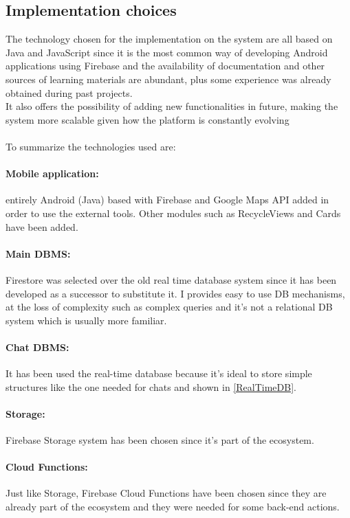 \clearpage
\subsection{Implementation choices}
\label{Implementation choices}
The technology chosen for the implementation on the system are all based on Java and JavaScript since it is the most common way of developing Android applications using Firebase and the availability of documentation and other sources of learning materials are abundant, plus some experience was already obtained during past projects. \\It also offers the possibility of adding new functionalities in future, making the system more scalable given how the platform is constantly evolving\\\\
To summarize the technologies used are:
\paragraph{Mobile application:} entirely Android (Java) based with Firebase and Google Maps API added in order to use the external tools. Other modules such as RecycleViews and Cards have been added.
\paragraph{Main DBMS:} Firestore was selected over the old real time database system since it has been developed as a successor to substitute it. I provides easy to use DB mechanisms, at the loss of complexity such as complex queries and it's not a relational DB system which is usually more familiar.
\paragraph{Chat DBMS:} It has been used the real-time database because it's ideal to store simple structures like the one needed for chats and shown in \autoref{RealTimeDB}.
\paragraph{Storage:} Firebase Storage system has been chosen since it's part of the ecosystem.
\paragraph{Cloud Functions:} Just like Storage, Firebase Cloud Functions have been chosen since they are already part of the ecosystem and they were needed for some back-end actions.

